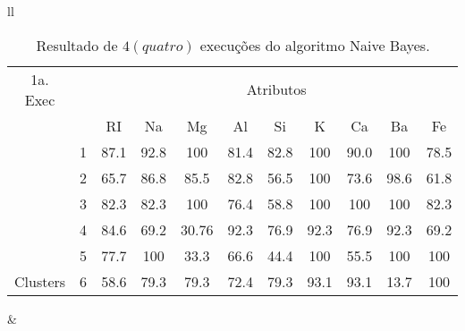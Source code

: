  
\begin{table}[!ht]
\caption{Resultado de ${4(quatro)}$ execuções do algoritmo Naive Bayes.}
 \begin{tabular}{ll}

  
   \small\addtolength{\tabcolsep}{-5pt}
    \begin{tabular}{|cl|c|c|c|c|c|c|c|c|c|}
        \hline \hline
            {\tiny 1a. Exec}     &   & \multicolumn{9}{c|}{\tiny Atributos}                                               \\ \cline{3-11} 
       \multicolumn{1}{|l}{}                            &   & RI    & Na    & Mg  & Al   & Si   & K   & Ca   & Ba  & Fe             \\ \hline
        \multicolumn{1}{|c|}{}                           & 1 & 87.1 & 92.8  & 100 & 81.4 & 82.8 & 100 & 90.0 & 100 & 78.5 \\ \cline{2-11} 
        \multicolumn{1}{|c|}{}                           & 2 & 65.7 & 86.8  & 85.5& 82.8 & 56.5 & 100  & 73.6 &98.6 & 61.8  \\ \cline{2-11} 
        \multicolumn{1}{|c|}{}                           & 3 & 82.3   & 82.3& 100  & 76.4 & 58.8 & 100  & 100 & 100 & 82.3  \\ \cline{2-11}
        \multicolumn{1}{|c|}{}                           & 4 & 84.6   & 69.2& 30.76  & 92.3 & 76.9 & 92.3  & 76.9 & 92.3 & 69.2  \\ \cline{2-11}
        \multicolumn{1}{|c|}{}                           & 5 & 77.7   & 100& 33.3  & 66.6 & 44.4 & 100  & 55.5 & 100 & 100  \\ \cline{2-11}
        \multicolumn{1}{|c|}{\multirow{-3}{*}{\tiny Clusters}} & 6 & 58.6 & 79.3& 79.3  & 72.4 & 79.3 & 93.1  & 93.1 & 13.7 & 100   \\ 
        
        \hline
      \end{tabular}
 &
 

\end{tabular}
\end{table}
